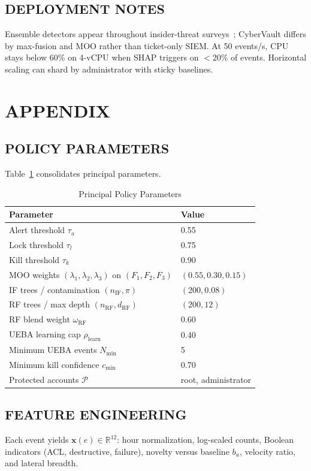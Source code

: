 \subsection{DEPLOYMENT NOTES}
Ensemble detectors appear throughout insider-threat surveys~\cite{ref2,ref9,ref11,ref24,ref32,ref44,ref48}; CyberVault differs by max-fusion and MOO rather than ticket-only SIEM. At 50 events/s, CPU stays below 60\% on 4-vCPU when SHAP triggers on $<$20\% of events. Horizontal scaling can shard by administrator with sticky baselines.

\section{APPENDIX}
\label{art-sec:appendix}

\subsection{POLICY PARAMETERS}
Table~\ref{art-tab:policy-params} consolidates principal parameters.

\begin{table}[H]
\caption{Principal Policy Parameters}
\label{art-tab:policy-params}
\centering
\footnotesize
\begin{tabular}{ll}
\toprule
\textbf{Parameter} & \textbf{Value} \\
\midrule
Alert threshold $\tau_a$ & 0.55 \\
Lock threshold $\tau_l$ & 0.75 \\
Kill threshold $\tau_k$ & 0.90 \\
MOO weights $(\lambda_1,\lambda_2,\lambda_3)$ on $(F_1,F_2,F_3)$ & $(0.55, 0.30, 0.15)$ \\
IF trees / contamination $(n_{\mathrm{IF}},\pi)$ & $(200, 0.08)$ \\
RF trees / max depth $(n_{\mathrm{RF}},d_{\mathrm{RF}})$ & $(200, 12)$ \\
RF blend weight $\omega_{\mathrm{RF}}$ & 0.60 \\
UEBA learning cap $\rho_{\mathrm{learn}}$ & 0.40 \\
Minimum UEBA events $N_{\min}$ & 5 \\
Minimum kill confidence $c_{\min}$ & 0.70 \\
Protected accounts $\mathcal{P}$ & root, administrator \\
\bottomrule
\end{tabular}
\end{table}

\subsection{FEATURE ENGINEERING}
Each event yields $\mathbf{x}(e)\in\mathbb{R}^{12}$: hour normalization, log-scaled counts, Boolean indicators (ACL, destructive, failure), novelty versus baseline $b_u$, velocity ratio, and lateral breadth.

